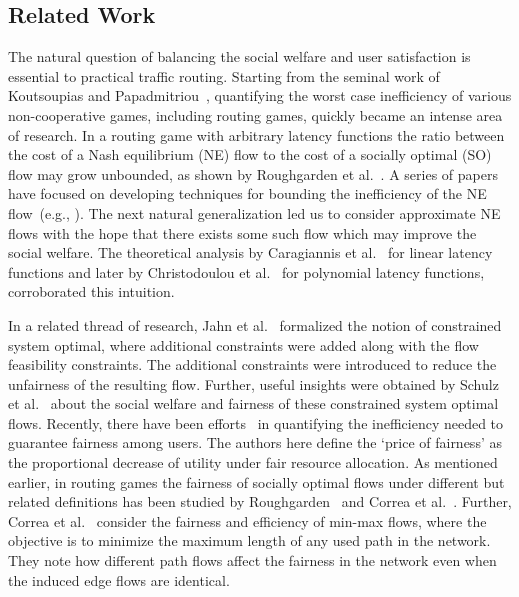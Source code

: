 \subsection{Related Work}
The natural question of balancing the social welfare and user satisfaction is essential to practical traffic routing. Starting from the seminal work of Koutsoupias and Papadmitriou~\cite{koutsoupias1999worst}, quantifying the worst case inefficiency of various non-cooperative games, including routing games, quickly became an intense area of research. In a routing game with arbitrary latency functions the ratio between the cost of a Nash equilibrium (NE) flow to the cost of a socially optimal (SO) flow may grow unbounded, as shown by Roughgarden et al.~\cite{roughgarden2002bad}. A series of papers have focused on developing techniques for bounding the inefficiency of the NE flow~(e.g., \cite{correa2008geometric, roughgarden2002bad, harks2007price}). 
The next natural generalization led us to consider approximate NE flows with the hope that there exists some such flow which may improve the social welfare. The theoretical analysis by Caragiannis et al.~\cite{caragiannis2006tight} for linear latency functions and later by  Christodoulou et al.~\cite{christodoulou2011performance} for polynomial latency functions, corroborated this intuition. 
  
In a related thread of research, Jahn et al.~\cite{jahn2005system} formalized the notion of constrained system optimal, where additional constraints were added along with the flow feasibility constraints. The additional constraints were introduced to reduce the unfairness of the resulting flow.  Further, useful insights were obtained by Schulz et al.~\cite{schulz2006efficiency} about the social welfare and fairness of these constrained system optimal flows. Recently, there have been efforts~\cite{bertsimas2011price, bertsimas2012efficiency} in quantifying the inefficiency needed to guarantee fairness among users. The authors here define the `price of fairness' as the proportional decrease of utility under fair resource allocation. As mentioned earlier, in routing games the fairness of socially optimal flows under different but related definitions has been studied by Roughgarden~\cite{roughgarden2002unfair} and Correa et al.~\cite{correa2004computational}. Further, Correa et al.~\cite{correa2007fast} consider the fairness and  efficiency of min-max flows, where the objective is to minimize the maximum length of any used path in the network.  They note how different path flows affect the fairness in the network even when the induced edge flows are identical. 
 
